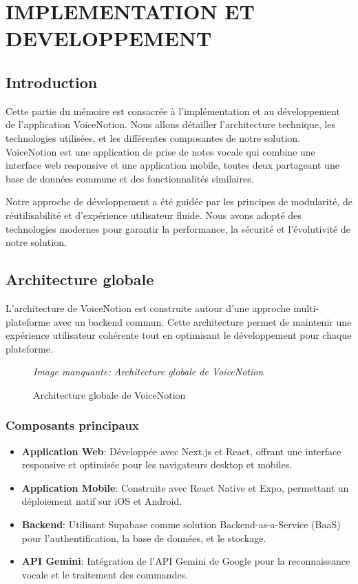 
\chapter{IMPLEMENTATION ET DEVELOPPEMENT}

\section{Introduction}
Cette partie du mémoire est consacrée à l'implémentation et au développement de l'application VoiceNotion. Nous allons détailler l'architecture technique, les technologies utilisées, et les différentes composantes de notre solution. VoiceNotion est une application de prise de notes vocale qui combine une interface web responsive et une application mobile, toutes deux partageant une base de données commune et des fonctionnalités similaires.

Notre approche de développement a été guidée par les principes de modularité, de réutilisabilité et d'expérience utilisateur fluide. Nous avons adopté des technologies modernes pour garantir la performance, la sécurité et l'évolutivité de notre solution.

\section{Architecture globale}
L'architecture de VoiceNotion est construite autour d'une approche multi-plateforme avec un backend commun. Cette architecture permet de maintenir une expérience utilisateur cohérente tout en optimisant le développement pour chaque plateforme.

\begin{figure}[H]
\centering
\textit{Image manquante: Architecture globale de VoiceNotion}
\caption{Architecture globale de VoiceNotion}
\label{fig:global-architecture}
\end{figure}

\subsection{Composants principaux}
\begin{itemize}
    \item \textbf{Application Web}: Développée avec Next.js et React, offrant une interface responsive et optimisée pour les navigateurs desktop et mobiles.
    \item \textbf{Application Mobile}: Construite avec React Native et Expo, permettant un déploiement natif sur iOS et Android.
    \item \textbf{Backend}: Utilisant Supabase comme solution Backend-as-a-Service (BaaS) pour l'authentification, la base de données, et le stockage.
    \item \textbf{API Gemini}: Intégration de l'API Gemini de Google pour la reconnaissance vocale et le traitement des commandes.
\end{itemize}

